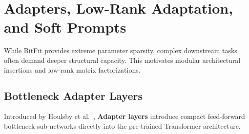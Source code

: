 \documentclass[../../../main.tex]{subfiles}
\begin{document}
\section{Adapters, Low-Rank Adaptation, and Soft Prompts}
\label{sec:adapters_lora_soft_prompts}

While BitFit provides extreme parameter sparsity, complex downstream tasks often demand deeper structural capacity. This motivates modular architectural insertions and low-rank matrix factorizations.

\subsection{Bottleneck Adapter Layers}
\label{subsec:bottleneck_adapters}

Introduced by Houlsby et al.~\citep{houlsby2019parameter}, \textbf{Adapter layers} introduce compact feed-forward bottleneck sub-networks directly into the pre-trained Transformer architecture.
\end{document}
